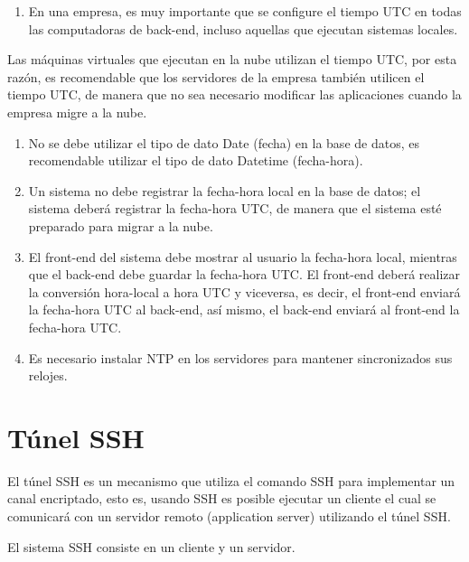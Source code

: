 \documentclass[11pt,a4paper,oneside]{book}
\begin{document}
\begin{enumerate}

\item En una empresa, es muy importante que se configure el tiempo UTC en todas las computadoras de back-end, incluso aquellas que ejecutan sistemas locales.

\end{enumerate}

Las máquinas virtuales que ejecutan en la nube utilizan el tiempo UTC, por esta razón, es recomendable que los servidores de la empresa también utilicen el tiempo UTC, de manera que no sea necesario modificar las aplicaciones cuando la empresa migre a la nube.

\begin{enumerate}

\item No se debe utilizar el tipo de dato Date (fecha) en la base de datos, es recomendable utilizar el tipo de dato Datetime (fecha-hora).

\item Un sistema no debe registrar la fecha-hora local en la base de datos; el sistema deberá registrar la fecha-hora UTC, de manera que el sistema esté preparado para migrar a la nube.

\item El front-end del sistema debe mostrar al usuario la fecha-hora local, mientras que el back-end debe guardar la fecha-hora UTC. El front-end deberá realizar la conversión hora-local a hora UTC y viceversa, es decir, el front-end enviará la fecha-hora UTC al back-end, así mismo, el back-end enviará al front-end la fecha-hora UTC.

\item Es necesario instalar NTP en los servidores para mantener sincronizados sus relojes.

\end{enumerate}

\chapter{Túnel SSH}

El túnel SSH es un mecanismo que utiliza el comando SSH para implementar un canal encriptado, esto es, usando SSH es posible ejecutar un cliente el cual se comunicará con un servidor remoto (application server) utilizando el túnel SSH.

El sistema SSH consiste en un cliente y un servidor.
\end{document}
